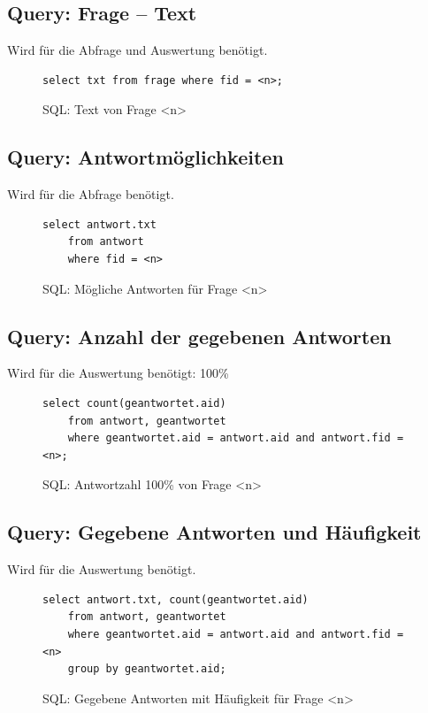 \subsection{Query: Frage -- Text}
Wird für die Abfrage und Auswertung benötigt.

\begin{figure}[h]
\begin{verbatim}
select txt from frage where fid = <n>;
\end{verbatim}
\caption{SQL: Text von Frage <n>}
\label{sql:qfragetxt}
\end{figure}

\subsection{Query: Antwortmöglichkeiten}
Wird für die Abfrage benötigt.

\begin{figure}[h]
\begin{verbatim}
select antwort.txt
	from antwort
	where fid = <n> 
\end{verbatim}
\caption{SQL: Mögliche Antworten für Frage <n>}
\label{sql:qantwnum}
\end{figure}


\subsection{Query: Anzahl der gegebenen Antworten}
Wird für die Auswertung benötigt: 100\%

\begin{figure}[h]
\begin{verbatim}
select count(geantwortet.aid) 
	from antwort, geantwortet 
	where geantwortet.aid = antwort.aid and antwort.fid = <n>;
\end{verbatim}
\caption{SQL: Antwortzahl 100\% von Frage <n>}
\label{sql:qantw100}
\end{figure}

\subsection{Query: Gegebene Antworten und Häufigkeit}
Wird für die Auswertung benötigt.

\begin{figure}[h]
\begin{verbatim}
select antwort.txt, count(geantwortet.aid) 
	from antwort, geantwortet 
	where geantwortet.aid = antwort.aid and antwort.fid = <n> 
	group by geantwortet.aid;
\end{verbatim}
\caption{SQL: Gegebene Antworten mit Häufigkeit für Frage <n>}
\label{sql:qantwnum}
\end{figure}




